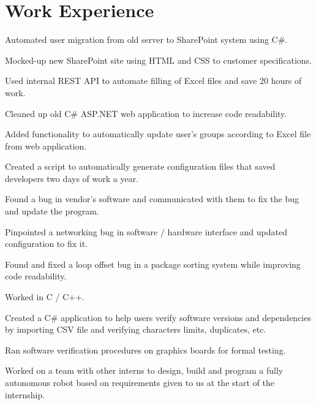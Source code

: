 \documentclass[]{deedy-resume-openfont}
\begin{document}
\section{Work Experience}
\hfill {}
\begin{tightemize}
	\item Automated user migration from old server to SharePoint system using C\#.
	\item Mocked-up new SharePoint site using HTML and CSS to customer specifications.
	\item Used internal REST API to automate filling of Excel files and save 20 hours of work.
	\item Cleaned up old C\# ASP.NET web application to increase code readability.
	\item Added functionality to automatically update user's groups according to Excel file from web application.
\end{tightemize}
\sectionsep
{}\hfill {}
\begin{tightemize}
	\item Created a script to automatically generate configuration files that saved developers two days of work a year.
	\item Found a bug in vendor's software and communicated with them to fix the bug and update the program.
	\item Pinpointed a networking bug in software / hardware interface and updated configuration to fix it.
	\item Found and fixed a loop offset bug in a package sorting system while improving code readability.
	\item Worked in C / C++.
\end{tightemize}
\sectionsep
{}\hfill {}
\begin{tightemize}
	\item Created a C\# application to help users verify software versions and dependencies by importing CSV file and verifying characters limits, duplicates, etc.
	\item Ran software verification procedures on graphics boards for formal testing.
	\item Worked on a team with other interns to design, build and program a fully autonomous robot based on requirements given to us at the start of the internship.
\end{tightemize}
\end{document}
